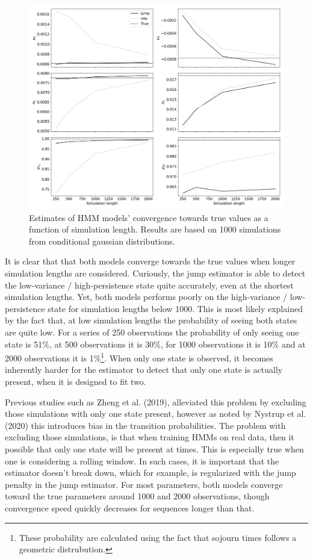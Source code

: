 \begin{figure}[H] 
    \centering
    \includegraphics[width=1\textwidth]{analysis/model_convergence/images/simulation_normal.png}
    \caption{Estimates of HMM models' convergence towards true values as a function of simulation length. Results are based on 1000 simulations from conditional gaussian distributions.}
    \label{fig:jump_normal}
\end{figure}

It is clear that that both models converge towards the true values when longer simulation lengths are considered. Curiously, the jump estimator is able to detect the low-variance / high-persistence state quite accurately, even at the shortest simulation lengths. Yet, both models performs poorly on the high-variance / low-persistence state for simulation lengths below 1000. This is most likely explained by the fact that, at low simulation lengths the probability of seeing both states are quite low. For a series of 250 observations the probability of only seeing one state is 51\%, at 500 observations it is 30\%, for 1000 observations it is 10\% and at 2000 observations it is 1\%\footnote
{These probability are calculated using the fact that sojourn times follows a geometric distrubution.
}. 
When only one state is observed, it becomes inherently harder for the estimator to detect that only one state is actually present, when it is designed to fit two.

Previous studies such as Zheng et al. (2019), alleviated this problem by excluding those simulations with only one state present, however as noted by Nystrup et al. (2020) this introduces bias in the transition probabilities. The problem with excluding those simulations, is that when training HMMs on real data, then it possible that only one state will be present at times. This is especially true when one is considering a rolling window. In such cases, it is important that the estimator doesn't break down, which for example, is regularized with the jump penalty in the jump estimator. For most parameters, both models converge toward the true parameters around 1000 and 2000 observations, though convergence speed quickly decreases for sequences longer than that.

